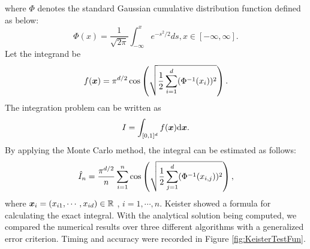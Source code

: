 \documentclass{iitthesis}
\theoremstyle{definition}
\begin{document}
where $\Phi$ denotes the standard Gaussian cumulative distribution function defined as below:
$$\Phi(x) = \frac{1}{\sqrt{2\pi}} \int_{-\infty}^x e^{-s^2/2}ds, x \in [-\infty, \infty].$$
Let the integrand be 
\begin{equation*}
f(\boldsymbol{x}) = \pi^{d/2} \cos \left( \sqrt{\frac{1}{2} \sum_{i=1}^d (\Phi^{-1} (x_i))^2}\right).
\end{equation*}
The integration problem can be written as
\begin{equation*}
I = \int_{[0,1]^d} f(\boldsymbol{x}){\rm d}\boldsymbol{x}.
\end{equation*}
By applying the Monte Carlo method, the integral can be estimated as follows:
\begin{align}
\hat{I}_n = \frac{\pi^{d/2}}{n}\sum_{i=1}^n \cos \left (\sqrt{\frac12 \sum_{j=1}^d (\Phi^{-1}(x_{i,j}))^2}\right),
\end{align}
where $\boldsymbol{x}_i = (x_{i1},\cdots,x_{id}) \in \mathbb{R}$ , $i=1,\cdots, n.$
Keister \cite{Keister96} showed a formula for calculating the exact integral. With the analytical solution being  computed, we compared the numerical results over three different algorithms with a generalized error criterion. Timing and accuracy were recorded in Figure \ref{fig:KeisterTestFun}.
\end{document}
